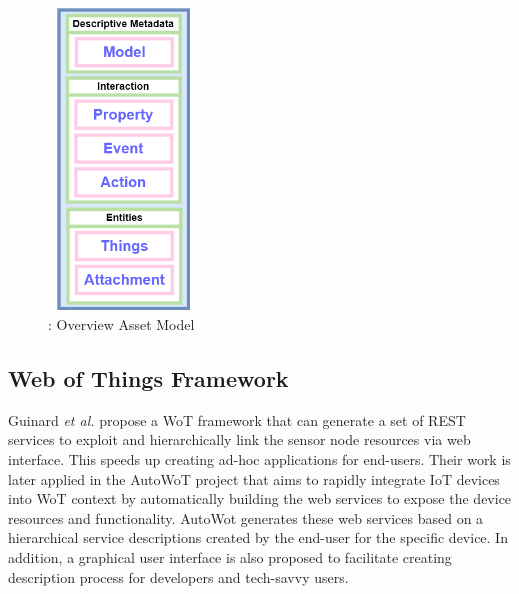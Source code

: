 \begin{figure}[h]
	\centering
	\includegraphics[width=4cm,height=8cm,keepaspectratio]{./Part2/Chapter6/figures/asset-descriptions-1.png}
	\caption{ : Overview Asset Model}
	\label{fig: Overview Asset Model}
\end{figure}
\subsection{Web of Things Framework}

Guinard \textit{et al.} propose a WoT framework that can generate a set of REST services to exploit and hierarchically link the sensor node resources via web interface\cite{guinard2009towards}. This speeds up creating ad-hoc applications for end-users. Their work is later applied in the AutoWoT project \cite{mayer2010facilitating} that aims to rapidly integrate IoT devices into WoT context by automatically building the web services to expose the device resources and functionality. AutoWot generates these web services based on a hierarchical service descriptions created by the end-user for the specific device. In addition, a graphical user interface is also proposed to facilitate creating description process for developers and tech-savvy users.\\

